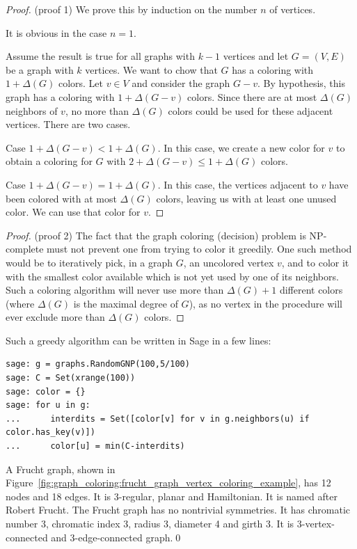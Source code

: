 \begin{proof}
(proof 1)
We prove this by induction on the number $n$ of vertices.

It is obvious in the case $n=1$.

Assume the result is true for all graphs with $k-1$ vertices and let
$G=(V,E)$ be a graph with $k$ vertices. We want to chow that $G$ has a
coloring with $1+\Delta(G)$ colors. Let $v\in V$ and consider the
graph $G-v$. By hypothesis, this graph has a coloring with
$1+\Delta(G-v)$ colors. Since there are at most $\Delta(G)$
neighbors of $v$, no more than $\Delta(G)$ colors could be used for
these adjacent vertices. There are two cases.

Case $1+\Delta(G-v) < 1+\Delta(G)$. In this case, we create a new
color for $v$ to obtain a coloring for $G$ with
$2+\Delta(G-v) \leq 1+\Delta(G)$ colors.

Case $1+\Delta(G-v) = 1+\Delta(G)$. In this case, the vertices adjacent to
$v$ have been colored with at most $\Delta(G)$ colors, leaving us with
at least one unused color. We can use that color for $v$.
\end{proof}

\begin{proof}
(proof 2)
The fact that the graph coloring (decision) problem
is NP-complete must not prevent one from trying to
color it greedily. One such
method would be to iteratively pick, in a graph $G$, an uncolored
vertex $v$, and to color it with the smallest color available which
is not yet used by one of its neighbors.
Such a coloring algorithm will never
use more than $\Delta(G)+1$ different
colors (where $\Delta(G)$ is the maximal degree of $G$), as
no vertex in the procedure will ever exclude more than
$\Delta(G)$ colors.
\end{proof}

Such a greedy algorithm can be written in Sage in a few lines:

\begin{lstlisting}
sage: g = graphs.RandomGNP(100,5/100)
sage: C = Set(xrange(100))
sage: color = {}
sage: for u in g:
...      interdits = Set([color[v] for v in g.neighbors(u) if color.has_key(v)])
...      color[u] = min(C-interdits)
\end{lstlisting}


\begin{example}
\label{eg:graph_coloring:frucht_graph_vertex_coloring_example}
\rm
A Frucht graph, shown in
Figure~\ref{fig:graph_coloring:frucht_graph_vertex_coloring_example},
has 12 nodes and 18 edges.  It is $3$-regular, planar and Hamiltonian.
It is named after Robert Frucht.  The Frucht graph has no nontrivial
symmetries.  It has chromatic number 3, chromatic index 3, radius 3,
diameter 4 and girth 3.  It is 3-vertex-connected and 3-edge-connected
graph.\qed
\end{example}

